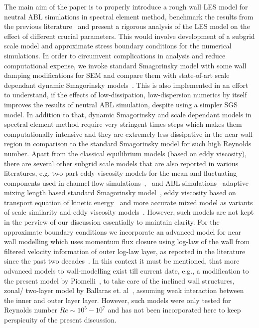 \documentclass[times]{fldauth}
\begin{document}
The main aim of the paper is to properly introduce a rough wall LES model for neutral ABL simulations in spectral element method, benchmark the results from the previous literature~\cite{porte1fun,bou1,meyers2,menx} and present a rigorous analysis of the LES model on the effect of different crucial parameters. This would involve development of a subgrid scale model and approximate stress boundary conditions for the numerical simulations. In order to circumvent complications in analysis and reduce computational expense, we invoke standard Smagorinsky model with some wall damping modifications for SEM and compare them with state-of-art scale dependant dynamic Smagorinsky models~\cite{porte1fun}. This is also implemented in an effort to understand, if the effects of low-dissipation, low-dispersion numerics by itself improves the results of neutral ABL simulation, despite using a simpler SGS model. In addition to that, dynamic Smagorinsky and scale dependant models in spectral element method require very stringent times steps which makes them computationally intensive and they are extremely less dissipative in the near wall region in comparison to the standard Smagorinsky model for such high Reynolds number. Apart from the classical equilibrium models (based on eddy viscosity), there are several other subgrid scale models that are also reported in various literatures, e.g. two part eddy viscosity models for the mean and fluctuating components used in channel flow simulations~\cite{schumann},~\cite{grot} and ABL simulations~\cite{sull,khan} adaptive mixing length based standard Smagorinsky model~\cite{meyers2}, eddy viscosity based on transport equation of kinetic energy~\cite{niu} and more accurate mixed model as variants of scale similarity and eddy viscosity models~\cite{bardina2,katz2,bal3}. However, such models are not kept in the perview of our discussion essentially to maintain clarity. For the approximate boundary conditions we incorporate an advanced model for near wall modelling which uses momentum flux closure using log-law of the wall from filtered velocity information of outer log-law layer, as reported in the literature since the past two decades~\cite{schumann,porte1fun,bou1,meyers2}. In this context it must be mentioned, that  more advanced models to wall-modelling exist till current date, e.g., a modification to the present model by Piomelli~\cite{pio_wall}, to take care of the inclined wall structures, zonal/ two-layer model by Ballaras et. al~\cite{bal2}, assuming weak interaction between the inner and outer layer layer. However, such models were only tested for Reynolds number $Re\sim 10^5 - 10^7$ and has not been incorporated here to keep perspicuity of the present discussion.
\end{document}
